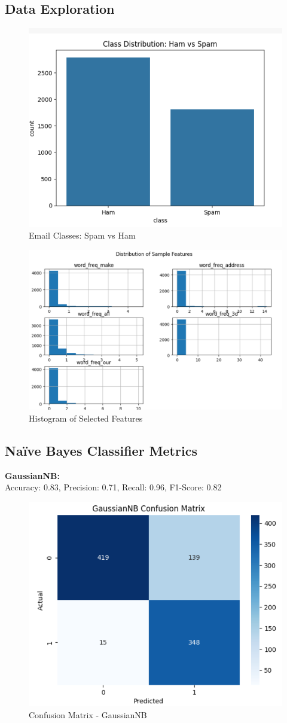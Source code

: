 \documentclass[12pt]{article}
\begin{document}
\subsection*{Data Exploration}
\begin{figure}[H]
    \centering
    \includegraphics[width=0.6\linewidth]{image1.png}
    \caption{Email Classes: Spam vs Ham}
\end{figure}

\begin{figure}[H]
    \centering
    \includegraphics[width=0.8\linewidth]{image2.png}
    \caption{Histogram of Selected Features}
\end{figure}

\subsection*{Naïve Bayes Classifier Metrics}
\textbf{GaussianNB:}\\
Accuracy: 0.83, Precision: 0.71, Recall: 0.96, F1-Score: 0.82

\begin{figure}[H]
    \centering
    \includegraphics[width=0.5\linewidth]{image3.png}
    \caption{Confusion Matrix - GaussianNB}
\end{figure}
\end{document}
